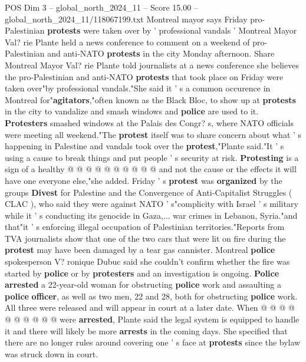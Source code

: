 \begin{textsample}{POS Dim 3 – global\_north\_2024\_11 – Score 15.00 – global\_north\_2024\_11/118067199.txt}  \label{ex:f3_pos_173}
Montreal mayor says Friday pro-Palestinian \textbf{protests} were taken over by ' professional vandals ' Montreal Mayor Val? rie Plante held a news conference to comment on a weekend of pro-Palestinian and anti-NATO \textbf{protests} in the city Monday afternoon.
Share Montreal Mayor Val? rie Plante told journalists at a news conference she believes the pro-Palestinian and anti-NATO \textbf{protests} that took place on Friday were taken over"by professional vandals."She said it ' s a common occurence in Montreal for"\textbf{agitators},"often known as the Black Bloc, to show up at \textbf{protests} in the city to vandalize and smash windows and \textbf{police} are used to it. \textbf{Protesters} smashed windows at the Palais des Congr? s, where NATO officials were meeting all weekend."The \textbf{protest} itself was to share concern about what ' s happening in Palestine and vandals took over the \textbf{protest},"Plante said."It ' s using a cause to break things and put people ' s security at risk. \textbf{Protesting} is a sign of a healthy @ @ @ @ @ @ @ @ @ @ and not the cause or the effects it will have one everyone else,"she added.
Friday ' s \textbf{protest} was \textbf{organized} by the groups \textbf{Divest} for Palestine and the Convergence of Anti-Capitalist Struggles ( CLAC ), who said they were against NATO ' s"complicity with Israel ' s military while it ' s conducting its genocide in Gaza,... war crimes in Lebanon, Syria."and that"it ' s enforcing illegal occupation of Palestinian territories."Reports from TVA journalists show that one of the two cars that were lit on fire during the \textbf{protest} may have been damaged by a tear gas cannister.
Montreal \textbf{police} spokesperson V? ronique Dubuc said she couldn't confirm whether the fire was started by \textbf{police} or by \textbf{protesters} and an investigation is ongoing. \textbf{Police} \textbf{arrested} a 22-year-old woman for obstructing \textbf{police} work and assaulting a \textbf{police} \textbf{officer}, as well as two men, 22 and 28, both for obstructing \textbf{police} work.
All three were released and will appear in court at a later date.
When @ @ @ @ @ @ @ @ @ @ were \textbf{arrested}, Plante said the legal system is equipped to handle it and there will likely be more \textbf{arrests} in the coming days.
She specified that there are no longer rules around covering one ' s face at \textbf{protests} since the bylaw was struck down in court.

\end{textsample}
